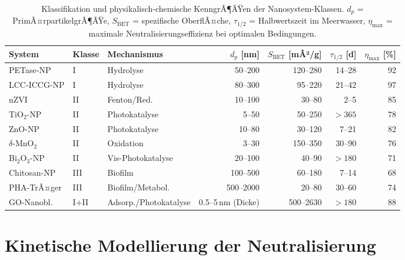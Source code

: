 ﻿\documentclass[12pt,a4paper]{article}
\theoremstyle{definition}
\theoremstyle{remark}
\begin{document}
\begin{table}
\centering
\caption{Klassifikation und physikalisch-chemische KenngrÃ¶ÃŸen der Nanosystem-Klassen.
  $d_p$ = PrimÃ¤rpartikelgrÃ¶ÃŸe, $S_{\text{BET}}$ = spezifische OberflÃ¤che,
  $\tau_{1/2}$ = Halbwertszeit im Meerwasser, $\eta_{\text{max}}$ = maximale
  Neutralisierungseffizienz bei optimalen Bedingungen.}
\label{tab:klassifikation}
\begin{tabular}{lllrrrr}
\toprule
\textbf{System} & \textbf{Klasse} & \textbf{Mechanismus} & $d_p$ [nm] & $S_{\text{BET}}$ [mÂ²/g] & $\tau_{1/2}$ [d] & $\eta_{\text{max}}$ [\%] \\
\midrule
PETase-NP & I  & Hydrolyse     & 50--200    & 120--280 & 14--28  & 92 \\
LCC-ICCG-NP & I & Hydrolyse   & 80--300    & 95--220  & 21--42  & 97 \\
nZVI       & II & Fenton/Red.  & 10--100    & 30--80   & 2--5    & 85 \\
TiO$_2$-NP & II & Photokatalyse & 5--50    & 50--250  & $>365$  & 78 \\
ZnO-NP     & II & Photokatalyse & 10--80   & 30--120  & 7--21   & 82 \\
$\delta$-MnO$_2$ & II & Oxidation & 3--30  & 150--350 & 30--90  & 76 \\
Bi$_2$O$_3$-NP & II & Vis-Photokatalyse & 20--100 & 40--90 & $>180$ & 71 \\
Chitosan-NP & III & Biofilm     & 100--500   & 60--180  & 7--14   & 68 \\
PHA-TrÃ¤ger & III & Biofilm/Metabol. & 500--2000 & 20--80 & 30--60 & 74 \\
GO-Nanobl. & I+II & Adsorp./Photokatalyse & 0.5--5\,nm (Dicke) & 500--2630 & $>180$ & 88 \\
\bottomrule
\end{tabular}
\end{table}

\section{Kinetische Modellierung der Neutralisierung}
\label{sec:kinetik}
\end{document}
